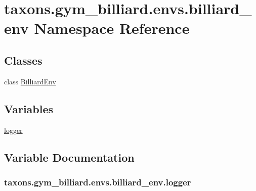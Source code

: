 \hypertarget{namespacetaxons_1_1gym__billiard_1_1envs_1_1billiard__env}{}\section{taxons.\+gym\+\_\+billiard.\+envs.\+billiard\+\_\+env Namespace Reference}
\label{namespacetaxons_1_1gym__billiard_1_1envs_1_1billiard__env}
\subsection*{Classes}
\begin{DoxyCompactItemize}
\item 
class \hyperlink{classtaxons_1_1gym__billiard_1_1envs_1_1billiard__env_1_1_billiard_env}{Billiard\+Env}
\end{DoxyCompactItemize}
\subsection*{Variables}
\begin{DoxyCompactItemize}
\item 
\hyperlink{namespacetaxons_1_1gym__billiard_1_1envs_1_1billiard__env_adae8aef03d5aee138784de7044a789d2}{logger}
\end{DoxyCompactItemize}


\subsection{Variable Documentation}
\subsubsection[{\texorpdfstring{logger}{logger}}]{\setlength{\rightskip}{0pt plus 5cm}taxons.\+gym\+\_\+billiard.\+envs.\+billiard\+\_\+env.\+logger}\hypertarget{namespacetaxons_1_1gym__billiard_1_1envs_1_1billiard__env_adae8aef03d5aee138784de7044a789d2}{}\label{namespacetaxons_1_1gym__billiard_1_1envs_1_1billiard__env_adae8aef03d5aee138784de7044a789d2}
